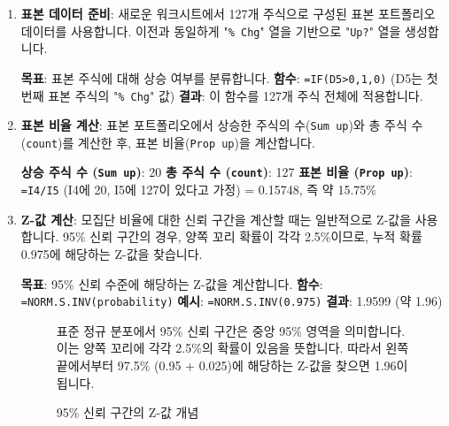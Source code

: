 \documentclass[11pt,a4paper]{book}
\newcommand{\excel}[1]{\texttt{#1}}
\theoremstyle{definition}
\begin{document}
\begin{enumerate}
    \item \textbf{표본 데이터 준비}:
    새로운 워크시트에서 127개 주식으로 구성된 표본 포트폴리오 데이터를 사용합니다. 이전과 동일하게 "\excel{\% Chg}" 열을 기반으로 "\excel{Up?}" 열을 생성합니다.
    \begin{examplebox}[title=Excel IF 함수 (표본 데이터)]
        \textbf{목표}: 표본 주식에 대해 상승 여부를 분류합니다.
        \textbf{함수}: \texttt{=IF(D5>0,1,0)} (D5는 첫 번째 표본 주식의 "\excel{\% Chg}" 값)
        \textbf{결과}: 이 함수를 127개 주식 전체에 적용합니다.
    \end{examplebox}

    \item \textbf{표본 비율 계산}:
    표본 포트폴리오에서 상승한 주식의 수(\excel{Sum up})와 총 주식 수(\excel{count})를 계산한 후, 표본 비율(\excel{Prop up})을 계산합니다.
    \begin{examplebox}[title=표본 비율 계산 결과]
        \textbf{상승 주식 수 (\excel{Sum up})}: 20
        \textbf{총 주식 수 (\excel{count})}: 127
        \textbf{표본 비율 (\excel{Prop up})}: \texttt{=I4/I5} (I4에 20, I5에 127이 있다고 가정) = 0.15748, 즉 약 15.75\%
    \end{examplebox}

    \item \textbf{Z-값 계산}:
    모집단 비율에 대한 신뢰 구간을 계산할 때는 일반적으로 Z-값을 사용합니다. 95\% 신뢰 구간의 경우, 양쪽 꼬리 확률이 각각 2.5\%이므로, 누적 확률 0.975에 해당하는 Z-값을 찾습니다.
    \begin{examplebox}[title=Excel NORM.S.INV 함수 사용법]
        \textbf{목표}: 95\% 신뢰 수준에 해당하는 Z-값을 계산합니다.
        \textbf{함수}: \texttt{=NORM.S.INV(probability)}
        \textbf{예시}: \texttt{=NORM.S.INV(0.975)}
        \textbf{결과}: 1.9599 (약 1.96)
    \end{examplebox}
    \begin{figure}[h!]
        \centering
        \begin{infobox}[title=Z-값 시각적 설명]
            표준 정규 분포에서 95\% 신뢰 구간은 중앙 95\% 영역을 의미합니다. 이는 양쪽 꼬리에 각각 2.5\%의 확률이 있음을 뜻합니다. 따라서 왼쪽 끝에서부터 97.5\% (0.95 + 0.025)에 해당하는 Z-값을 찾으면 1.96이 됩니다.
        \end{infobox}
        \caption{95\% 신뢰 구간의 Z-값 개념}
        \label{fig:z_value_concept}
    \end{figure}


\end{enumerate}
\end{document}
